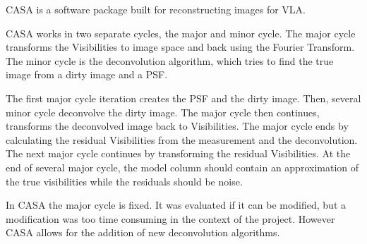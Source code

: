 CASA is a software package built for reconstructing images for VLA. 

CASA works in two separate cycles, the major and minor cycle. The major cycle transforms the Visibilities to image space and back using the Fourier Transform. The minor cycle is the deconvolution algorithm, which tries to find the true image from a dirty image and a PSF. 

The first major cycle iteration creates the PSF and the dirty image. Then, several minor cycle deconvolve the dirty image. The major cycle then continues, transforms the deconvolved image back to Visibilities. The major cycle ends by calculating the residual Visibilities from the measurement and the deconvolution. The next major cycle continues by transforming the residual Visibilities. At the end of several major cycle, the model column should contain an approximation of the true visibilities while the residuals should be noise. %

In CASA the major cycle is fixed. It was evaluated if it can be modified, but a modification was too time consuming in the context of the project. However CASA allows for the addition of new deconvolution algorithms. 







 
